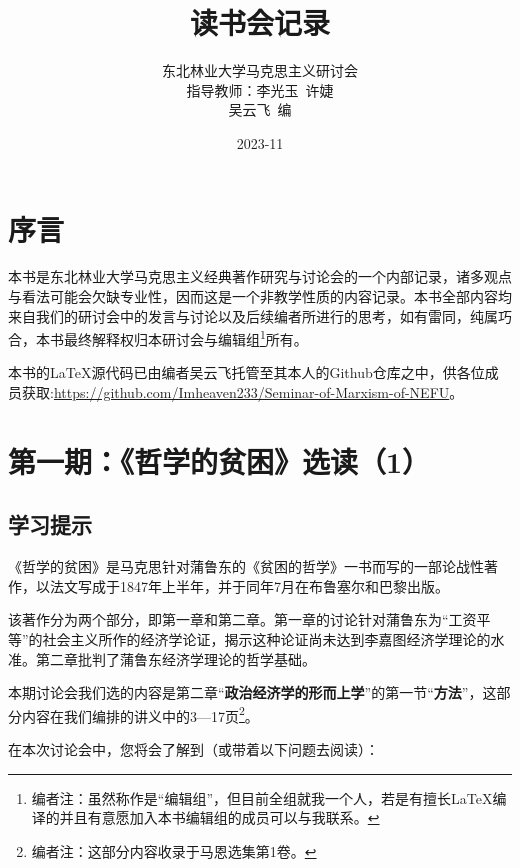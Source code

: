 \documentclass[a4paper,twoside,12pt,AutoFakeBold]{ctexart}
\title{读书会记录}
\author{东北林业大学马克思主义研讨会\\
指导教师：李光玉~许婕\\
 吴云飞~编}
\date{2023-11}
\begin{document}
\maketitle
\newpage



\tableofcontents%

\newpage

\section{序言}

\begin{adjustwidth}{2em}{2em}
\qquad\fangsong 
本书是东北林业大学马克思主义经典著作研究与讨论会的一个内部记录，诸多观点与看法可能会欠缺专业性，因而这是一个非教学性质的内容记录。本书全部内容均来自我们的研讨会中的发言与讨论以及后续编者所进行的思考，如有雷同，纯属巧合，本书最终解释权归本研讨会与编辑组\footnote{编者注：虽然称作是“编辑组”，但目前全组就我一个人，若是有擅长\LaTeX{}编译的并且有意愿加入本书编辑组的成员可以与我联系。}所有。

本书的\LaTeX{}源代码已由编者吴云飞托管至其本人的Github仓库之中，供各位成员获取:\url{https://github.com/Imheaven233/Seminar-of-Marxism-of-NEFU}。

\end{adjustwidth}




\newpage

\section{第一期：《哲学的贫困》选读（1）}

\subsection{学习提示}\label{sec:1}

《哲学的贫困》是马克思针对蒲鲁东的《贫困的哲学》一书而写的一部论战性著作，以法文写成于1847年上半年，并于同年7月在布鲁塞尔和巴黎出版。

该著作分为两个部分，即第一章和第二章。第一章的讨论针对蒲鲁东为“工资平等”的社会主义所作的经济学论证，揭示这种论证尚未达到李嘉图经济学理论的水准。第二章批判了蒲鲁东经济学理论的哲学基础。

本期讨论会我们选的内容是第二章“\textbf{政治经济学的形而上学}”的第一节“\textbf{方法}”，这部分内容在我们编排的讲义中的3—17页\footnote{编者注：这部分内容收录于马恩选集第1卷。}。

在本次讨论会中，您将会了解到（或带着以下问题去阅读）：
\end{document}
